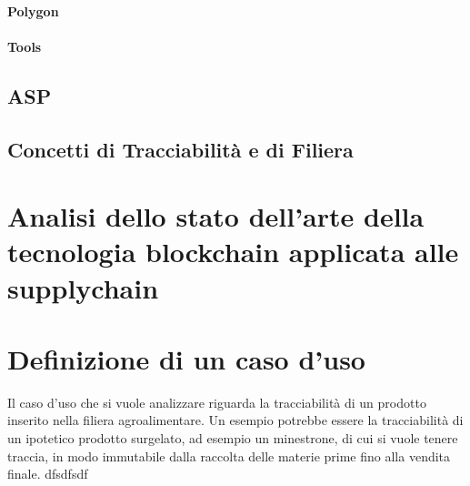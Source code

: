 \documentclass[a4paper,11pt]{article}
\begin{document}
\paragraph{Polygon}
\paragraph{Tools}

\subsection{ASP}

\subsection{Concetti di Tracciabilità e di Filiera}

\section{Analisi dello stato dell’arte della tecnologia blockchain applicata alle supplychain}
\section{Definizione di un caso d’uso}
Il caso d'uso che si vuole analizzare riguarda la tracciabilità di un prodotto inserito nella filiera agroalimentare. Un esempio potrebbe essere la tracciabilità di un ipotetico prodotto surgelato, ad esempio un minestrone, di cui si vuole tenere traccia, in modo immutabile dalla raccolta delle materie prime fino alla vendita finale. dfsdfsdf
























\end{document}
